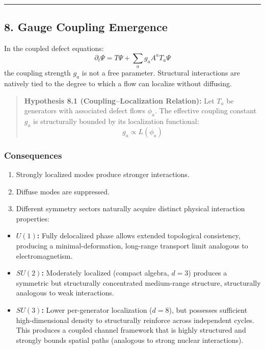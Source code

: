 \documentclass[
]{article}
\providecommand{\tightlist}{%
  \setlength{\itemsep}{0pt}\setlength{\parskip}{0pt}}
\begin{document}
\begin{center}\rule{0.5\linewidth}{0.5pt}\end{center}

\subsection{8. Gauge Coupling
Emergence}\label{gauge-coupling-emergence-1}

In the coupled defect equations:
\[ \partial_t \Psi = T \Psi + \sum_a g_a A^a T_a \Psi \] the coupling
strength \(g_a\) is not a free parameter. Structural interactions are
natively tied to the degree to which a flow can localize without
diffusing.

\begin{quote}
\textbf{Hypothesis 8.1 (Coupling--Localization Relation):} Let \(T_a\)
be generators with associated defect flows \(\phi_a\). The effective
coupling constant \(g_a\) is structurally bounded by its localization
functional: \[ g_a \propto L(\phi_a) \]
\end{quote}

\subsubsection{Consequences}\label{consequences}

\begin{enumerate}
\def\labelenumi{\arabic{enumi}.}
\tightlist
\item
  Strongly localized modes produce stronger interactions.
\item
  Diffuse modes are suppressed.
\item
  Different symmetry sectors naturally acquire distinct physical
  interaction properties:
\end{enumerate}

\begin{itemize}
\tightlist
\item
  \textbf{\(U(1)\):} Fully delocalized phase allows extended topological
  consistency, producing a minimal-deformation, long-range transport
  limit analogous to electromagnetism.
\item
  \textbf{\(SU(2)\):} Moderately localized (compact algebra, \(d=3\))
  produces a symmetric but structurally concentrated medium-range
  structure, structurally analogous to weak interactions.
\item
  \textbf{\(SU(3)\):} Lower per-generator localization (\(d=8\)), but
  possesses sufficient high-dimensional density to structurally
  reinforce across independent cycles. This produces a coupled channel
  framework that is highly structured and strongly bounds spatial paths
  (analogous to strong nuclear interactions).
\end{itemize}
\end{document}

